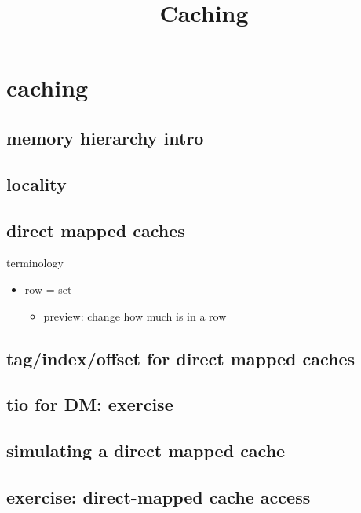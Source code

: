 \graphicspath{{./figures/}}
\title{Caching}
\date{}



\section{caching}

\subsection{memory hierarchy intro}


\subsection{locality}


\subsection{direct mapped caches}


\begin{frame}{terminology}
    \begin{itemize}
    \item row = set
        \begin{itemize}
        \item preview: change how much is in a row
        \end{itemize}
    \end{itemize}
\end{frame}

\subsection{tag/index/offset for direct mapped caches}


\subsection{tio for DM: exercise}


\subsection{simulating a direct mapped cache}


\subsection{exercise: direct-mapped cache access}


